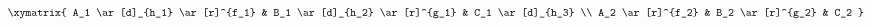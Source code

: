 \[
\xymatrix{
	A_1 \ar[d]_{h_1} \ar[r]^{f_1}
	& B_1 \ar[d]_{h_2} \ar[r]^{g_1}
	& C_1 \ar[d]_{h_3}
	\\
	A_2 \ar[r]^{f_2}
	& B_2 \ar[r]^{g_2}
	& C_2
}
\]